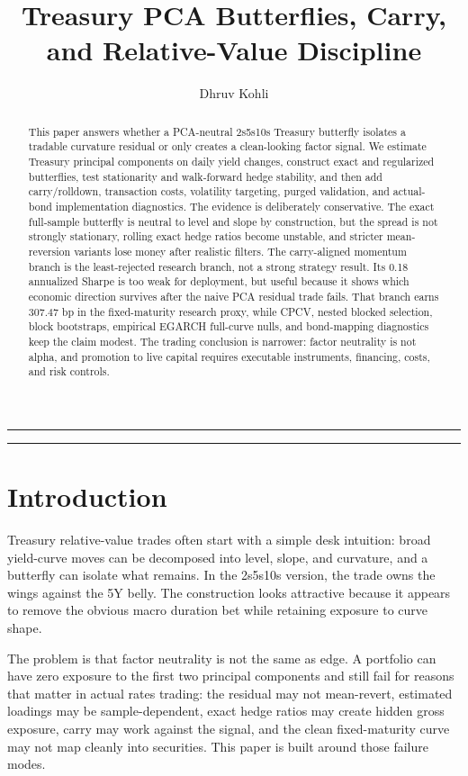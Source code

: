 \documentclass[12pt]{article}
\title{\vspace{-0.5cm}Treasury PCA Butterflies, Carry, and Relative-Value Discipline}
\author{Dhruv Kohli}
\date{}
\begin{document}
\maketitle
\vspace{-0.5cm}
\noindent\rule{\textwidth}{0.4pt}

\begin{abstract}
This paper answers whether a PCA-neutral 2s5s10s Treasury butterfly isolates a tradable
curvature residual or only creates a clean-looking factor signal. We estimate Treasury
principal components on daily yield changes, construct exact and regularized butterflies, test
stationarity and walk-forward hedge stability, and then add carry/rolldown, transaction costs,
volatility targeting, purged validation, and actual-bond implementation diagnostics. The evidence is
deliberately conservative. The exact full-sample butterfly is neutral to level and slope by
construction, but the spread is not strongly stationary, rolling exact hedge ratios become unstable,
and stricter mean-reversion variants lose money after realistic filters. The carry-aligned momentum
branch is the least-rejected research branch, not a strong strategy result. Its 0.18 annualized
Sharpe is too weak for deployment, but useful because it shows which economic direction survives
after the naive PCA residual trade fails. That branch earns 307.47 bp in the fixed-maturity research
proxy, while CPCV, nested blocked selection, block bootstraps, empirical EGARCH full-curve nulls,
and bond-mapping diagnostics keep the claim modest. The trading conclusion is narrower: factor
neutrality is not alpha, and promotion to live capital requires executable instruments, financing,
costs, and risk controls.
\end{abstract}

\noindent\rule{\textwidth}{0.4pt}

\section{Introduction}

Treasury relative-value trades often start with a simple desk intuition: broad yield-curve moves can
be decomposed into level, slope, and curvature, and a butterfly can isolate what remains. In the
2s5s10s version, the trade owns the wings against the 5Y belly. The construction looks attractive
because it appears to remove the obvious macro duration bet while retaining exposure to curve
shape.

The problem is that factor neutrality is not the same as edge. A portfolio can have zero exposure to
the first two principal components and still fail for reasons that matter in actual rates trading:
the residual may not mean-revert, estimated loadings may be sample-dependent, exact hedge ratios
may create hidden gross exposure, carry may work against the signal, and the clean fixed-maturity
curve may not map cleanly into securities. This paper is built around those failure modes.
\end{document}
